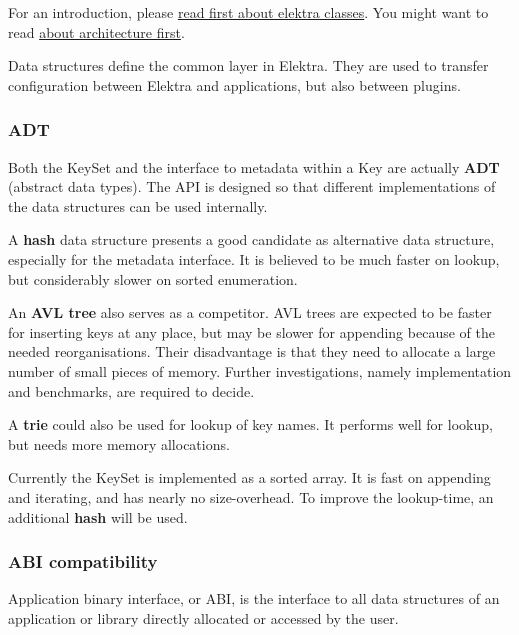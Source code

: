 For an introduction, please \hyperlink{md_doc_help_elektra-classes_doc_help_elektra-classes_md}{read first about elektra classes}. You might want to read \hyperlink{md_doc_help_elektra-architecture_doc_help_elektra-architecture_md}{about architecture first}.

Data structures define the common layer in Elektra. They are used to transfer configuration between Elektra and applications, but also between plugins.

\subsubsection*{A\+D\+T}

Both the {\ttfamily Key\+Set} and the interface to metadata within a {\ttfamily Key} are actually {\bfseries A\+D\+T} (abstract data types). The A\+P\+I is designed so that different implementations of the data structures can be used internally.

A {\bfseries hash} data structure presents a good candidate as alternative data structure, especially for the metadata interface. It is believed to be much faster on lookup, but considerably slower on sorted enumeration.

An {\bfseries A\+V\+L tree} also serves as a competitor. A\+V\+L trees are expected to be faster for inserting keys at any place, but may be slower for appending because of the needed reorganisations. Their disadvantage is that they need to allocate a large number of small pieces of memory. Further investigations, namely implementation and benchmarks, are required to decide.

A {\bfseries trie} could also be used for lookup of key names. It performs well for lookup, but needs more memory allocations.

Currently the {\ttfamily Key\+Set} is implemented as a sorted array. It is fast on appending and iterating, and has nearly no size-\/overhead. To improve the lookup-\/time, an additional {\bfseries hash} will be used.

\subsubsection*{A\+B\+I compatibility}

Application binary interface, or A\+B\+I, is the interface to all data structures of an application or library directly allocated or accessed by the user.

